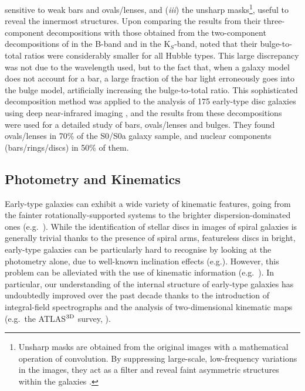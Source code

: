 sensitive to weak bars and ovals/lenses, 
and (\emph{iii}) the unsharp masks\footnote{Unsharp masks are obtained from the original images 
with a mathematical operation of convolution. By suppressing large-scale, low-frequency variations 
in the images, they act as a filter and reveal faint asymmetric structures within the galaxies 
\citep{malinzealey1979,erwinsparke2003}.}, useful to reveal the innermost structures. 
Upon comparing the results from their three-component decompositions 
with those obtained from the two-component decompositions of \cite{simiendevaucouleurs1986} in the B-band 
and \cite{desouza2004} in the K$_S$-band, 
\cite{laurikainen2005} noted that their bulge-to-total ratios were considerably smaller for all Hubble types. 
This large discrepancy was not due to the wavelength used, 
but to the fact that, when a galaxy model does not account for a bar, 
a large fraction of the bar light erroneously goes into the bulge model, 
artificially increasing the bulge-to-total ratio. 
This sophisticated decomposition method was applied to the analysis of 175 early-type disc galaxies 
using deep near-infrared imaging \citep{laurikainen2007,laurikainen2010},  
and the results from these decompositions were used for a detailed study of bars, ovals/lenses and bulges. 
They found ovals/lenses in 70\% of the S0/S0a galaxy sample, 
and nuclear components (bars/rings/discs) in 50\% of them. 



\subsection{Photometry and Kinematics}
\label{sec:photokin}
Early-type galaxies can exhibit a wide variety of kinematic features, 
going from the fainter rotationally-supported systems to the brighter dispersion-dominated ones (e.g.~\citealt{davies1983}). 
While the identification of stellar discs in images of spiral galaxies is generally trivial thanks to the presence of spiral arms, 
featureless discs in bright, early-type galaxies can be particularly hard to recognise 
by looking at the photometry alone, due to well-known inclination effects (e.g.\citealt{rixwhite1990,gerhardbinney1996}). 
However, this problem can be alleviated with the use of kinematic information
(e.g.~\citealt{carter1987,franx1989,nieto1991,rixwhite1992,cinzanovandermarel1993,donofrio1995,graham1998fornax}).
In particular, our understanding of the internal structure of early-type galaxies has undoubtedly improved over the past decade 
thanks to the introduction of integral-field spectrographs and the analysis of two-dimensional kinematic maps 
(e.g.~the ATLAS$^{\rm 3D}$ survey, \citealt{cappellari2011}). \\

